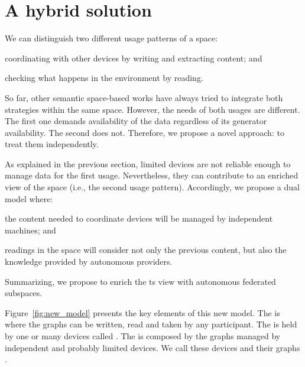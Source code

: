 \section{A hybrid solution} %
\label{sec:hybrid_solution}

We can distinguish two different usage patterns of a space:
\begin{enumerate*}[label=\itshape(\arabic*\upshape)]
  \item coordinating with other devices by writing and extracting content; and %
  \item checking what happens in the environment by reading.
\end{enumerate*}
So far, other semantic space-based works have always tried to integrate both strategies within the same space.
However, the needs of both usages are different.
The first one demands availability of the data regardless of its generator availability.
The second does not. %
Therefore, we propose a novel approach: to treat them independently.



As explained in the previous section, limited devices are not reliable enough to manage data for the first usage.
Nevertheless, they can contribute to an enriched view of the space (i.e., the second usage pattern).
Accordingly, we propose a dual model where:
\begin{enumerate*}[label=\itshape(\arabic*\upshape)]
  \item the content needed to coordinate devices will be managed by independent machines; and
  \item readings in the space will consider not only the previous content, but also the knowledge provided by autonomous providers.
\end{enumerate*}
Summarizing, we propose to enrich the \ac{ts} view with autonomous federated subspaces.


Figure~\ref{fig:new_model} presents the key elements of this new model.
The \coordspace{} is where the graphs can be written, read and taken by any participant.
The \coordspace{} is held by one or many devices called \coordinators{}.
The \outerspace{} is composed by the graphs managed by independent and probably limited devices.
We call these devices \asteroids{} and their graphs \selfgraphs{}.


